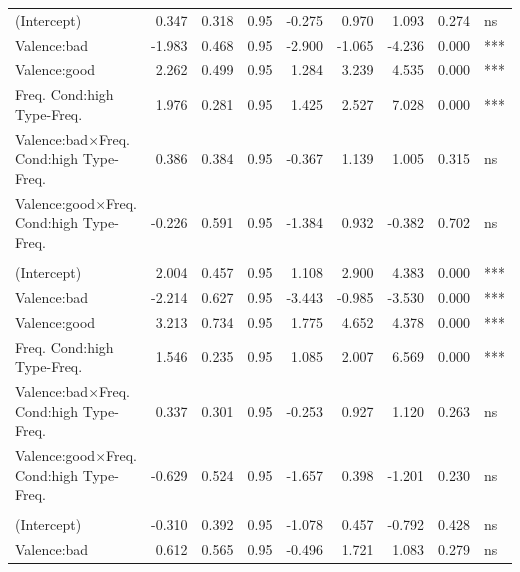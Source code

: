 \documentclass[
]{article}
\begin{document}
\begin{longtable}[t]{lrrrrrrrl}
\hspace{1em}(Intercept) & 0.347 & 0.318 & 0.95 & -0.275 & 0.970 & 1.093 & 0.274 & ns\\
\hspace{1em}Valence:bad & -1.983 & 0.468 & 0.95 & -2.900 & -1.065 & -4.236 & 0.000 & ***\\
\hspace{1em}Valence:good & 2.262 & 0.499 & 0.95 & 1.284 & 3.239 & 4.535 & 0.000 & ***\\
Freq.
Cond:high
\hspace{1em}Type-Freq. & 1.976 & 0.281 & 0.95 & 1.425 & 2.527 & 7.028 & 0.000 & ***\\
Valence:bad$\times$Freq.
Cond:high
\hspace{1em}Type-Freq. & 0.386 & 0.384 & 0.95 & -0.367 & 1.139 & 1.005 & 0.315 & ns\\
Valence:good$\times$Freq.
Cond:high
\hspace{1em}Type-Freq. & -0.226 & 0.591 & 0.95 & -1.384 & 0.932 & -0.382 & 0.702 & ns\\
\addlinespace[0.3em]
\multicolumn{9}{l}{\textbf{Third Party Acceptability - Testable}}\\
\hspace{1em}(Intercept) & 2.004 & 0.457 & 0.95 & 1.108 & 2.900 & 4.383 & 0.000 & ***\\
\hspace{1em}Valence:bad & -2.214 & 0.627 & 0.95 & -3.443 & -0.985 & -3.530 & 0.000 & ***\\
\hspace{1em}Valence:good & 3.213 & 0.734 & 0.95 & 1.775 & 4.652 & 4.378 & 0.000 & ***\\
Freq.
Cond:high
\hspace{1em}Type-Freq. & 1.546 & 0.235 & 0.95 & 1.085 & 2.007 & 6.569 & 0.000 & ***\\
Valence:bad$\times$Freq.
Cond:high
\hspace{1em}Type-Freq. & 0.337 & 0.301 & 0.95 & -0.253 & 0.927 & 1.120 & 0.263 & ns\\
Valence:good$\times$Freq.
Cond:high
\hspace{1em}Type-Freq. & -0.629 & 0.524 & 0.95 & -1.657 & 0.398 & -1.201 & 0.230 & ns\\
\addlinespace[0.3em]
\multicolumn{9}{l}{\textbf{Prevalence - Students}}\\
\hspace{1em}(Intercept) & -0.310 & 0.392 & 0.95 & -1.078 & 0.457 & -0.792 & 0.428 & ns\\
\hspace{1em}Valence:bad & 0.612 & 0.565 & 0.95 & -0.496 & 1.721 & 1.083 & 0.279 & ns\\

\end{longtable}
\end{document}
